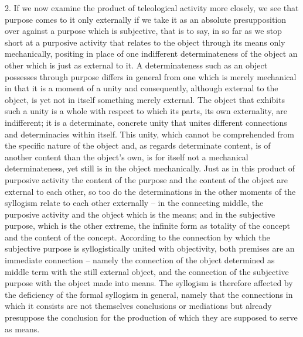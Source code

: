 2. If we now examine the product of teleological activity more closely,
we see that purpose comes to it only externally if we take it as an absolute
presupposition over against a purpose which is subjective, that is to say,
in so far as we stop short at a purposive activity that relates to the object
through its means only mechanically, positing in place of one indifferent
determinateness of the object an other which is just as external to it. A
determinateness such as an object possesses through purpose differs in
general from one which is merely mechanical in that it is a moment of
a unity and consequently, although external to the object, is yet not in
itself something merely external. The object that exhibits such a unity is a
whole with respect to which its parts, its own externality, are indifferent;
it is a determinate, concrete unity that unites different connections and
determinacies within itself. This unity, which cannot be comprehended
from the specific nature of the object and, as regards determinate content,
is of another content than the object's own, is for itself not a mechanical
determinateness, yet still is in the object mechanically. Just as in this product
of purposive activity the content of the purpose and the content of the
object are external to each other, so too do the determinations in the other
moments of the syllogism relate to each other externally – in the connecting
middle, the purposive activity and the object which is the means; and in the
subjective purpose, which is the other extreme, the infinite form as totality
of the concept and the content of the concept. According to the connection
by which the subjective purpose is syllogistically united with objectivity,
both premises are an immediate connection – namely the connection of
the object determined as middle term with the still external object, and the
connection of the subjective purpose with the object made into means. The
syllogism is therefore affected by the deficiency of the formal syllogism in
general, namely that the connections in which it consists are not themselves
conclusions or mediations but already presuppose the conclusion for the
production of which they are supposed to serve as means.

